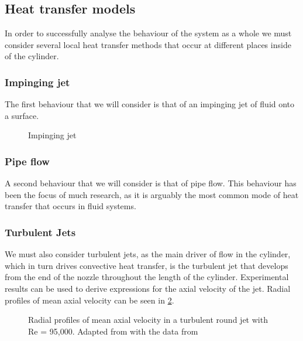 
\subsection{Heat transfer models}

In order to successfully analyse the behaviour of the system as a whole we must consider several local heat transfer methods that occur at different places inside of the cylinder.



\subsubsection{Impinging jet}

 The first behaviour that we will consider is that of an impinging jet of fluid onto a surface. 
 
 
 \begin{figure}[H]
\begin{centering}
\caption{Impinging jet}
\label{fig:inpinging_jet}
\end{centering}
\end{figure}


 
\subsubsection{Pipe flow}

A second behaviour that we will consider is that of pipe flow. This behaviour has been the focus of much research, as it is arguably the most common mode of heat transfer that occurs in fluid systems.

\subsubsection{Turbulent Jets}
\label{sec:turbulentJets}
We must also consider turbulent jets, as the main driver of flow in the cylinder, which in turn drives convective heat transfer, is the turbulent jet that develops from the end of the nozzle throughout the length of the cylinder. Experimental results can be used to derive expressions for the axial velocity of the jet. Radial profiles of  mean axial velocity can be seen in \cref{fig:radialProfile}.

\begin{figure}[H]
\begin{centering}
\caption{Radial profiles of mean axial velocity in a turbulent round jet with Re = 95,000. Adapted from \cite{pope2000} with the data from \cite{hussein1994}}
\label{fig:radialProfile}
\end{centering}
\end{figure}


